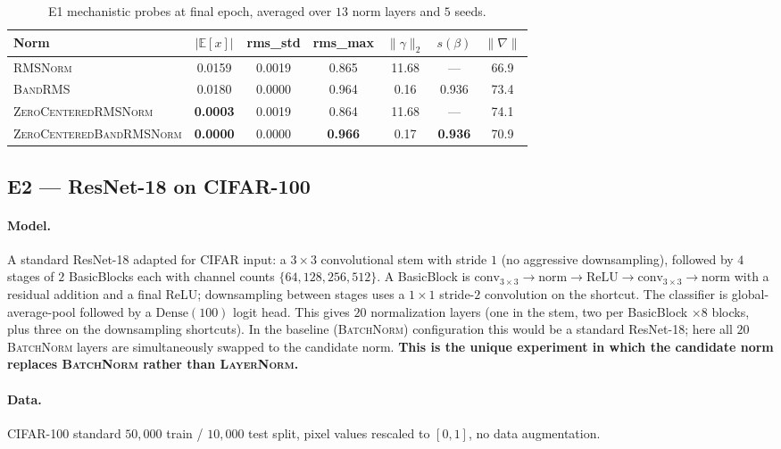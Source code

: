 \documentclass{article}
\newcommand{\E}{\mathbb{E}}
\newcommand{\rms}{\textsc{RMSNorm}}
\newcommand{\bandrms}{\textsc{BandRMS}}
\newcommand{\zcrms}{\textsc{ZeroCentered}\-\textsc{RMSNorm}}
\newcommand{\zcband}{\textsc{ZeroCentered}\-\textsc{BandRMSNorm}}
\newcommand{\layernorm}{\textsc{LayerNorm}}
\newcommand{\batchnorm}{\textsc{BatchNorm}}
\begin{document}
\begin{table}[H]
\centering
\caption{E1 mechanistic probes at final epoch, averaged over $13$ norm layers and $5$ seeds.}
\label{tab:e1probe}
\renewcommand{\arraystretch}{1.15}
\begin{tabular}{lcccccc}
\toprule
\textbf{Norm} & \textbf{$|\E[x]|$} & \textbf{rms\_std} & \textbf{rms\_max} & \textbf{$\|\gamma\|_2$} & \textbf{$s(\beta)$} & \textbf{$\|\nabla\|$} \\
\midrule
\rms{}            & 0.0159 & 0.0019 & 0.865 & 11.68 & --- & 66.9 \\
\bandrms{}        & 0.0180 & 0.0000 & 0.964 & 0.16  & 0.936 & 73.4 \\
\zcrms{}          & \textbf{0.0003} & 0.0019 & 0.864 & 11.68 & --- & 74.1 \\
\zcband{}         & \textbf{0.0000} & 0.0000 & \textbf{0.966} & 0.17 & \textbf{0.936} & 70.9 \\
\bottomrule
\end{tabular}
\end{table}

\subsection{E2 --- ResNet-18 on CIFAR-100}
\label{sec:e2}

\paragraph{Model.}
A standard ResNet-18 adapted for CIFAR input: a $3 \times 3$ convolutional stem with stride $1$ (no aggressive downsampling), followed by $4$ stages of $2$ BasicBlocks each with channel counts $\{64, 128, 256, 512\}$.
A BasicBlock is $\text{conv}_{3{\times}3} \to \text{norm} \to \text{ReLU} \to \text{conv}_{3{\times}3} \to \text{norm}$ with a residual addition and a final ReLU; downsampling between stages uses a $1{\times}1$ stride-$2$ convolution on the shortcut.
The classifier is global-average-pool followed by a $\text{Dense}(100)$ logit head.
This gives $20$ normalization layers (one in the stem, two per BasicBlock $\times 8$ blocks, plus three on the downsampling shortcuts).
In the baseline (\batchnorm{}) configuration this would be a standard ResNet-18; here all $20$ \batchnorm{} layers are simultaneously swapped to the candidate norm.
\textbf{This is the unique experiment in which the candidate norm replaces \batchnorm{} rather than \layernorm{}.}

\paragraph{Data.}
CIFAR-100 standard $50{,}000$ train / $10{,}000$ test split, pixel values rescaled to $[0, 1]$, no data augmentation.
\end{document}
